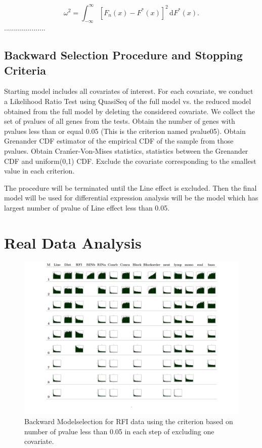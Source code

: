 \documentclass[11pt]{article}
\begin{document}
\[
\omega^2 = \int_{-\infty}^{\infty} [F_n(x)-F^*(x)]^2\,\mathrm{d}F^*(x) .
\]
.....................
\subsection{Backward Selection Procedure and Stopping Criteria}

Starting model includes all covariates of interest. For each covariate,
we conduct a Likelihood Ratio Test using QuasiSeq of the full model
vs. the reduced model obtained from the full model by deleting the
considered covariate. We collect the set of pvalues of all genes from
the tests.
Obtain the number of genes with pvalues less than or equal 0.05 (This is the criterion named pvalue05).
Obtain Grenander CDF estimator of the empirical CDF of the sample
from those pvalues.
Obtain Craḿer-Von-Mises statistics,
 statistics between the Grenander CDF and
uniform(0,1) CDF.
Exclude the covariate corresponding to the smallest value in each criterion.

The procedure will be terminated until the Line effect is excluded.  Then the final model will be used for differential expression analysis will be the model which has largest number of pvalue of Line effect less than 0.05.
\section{Real Data Analysis}
\begin{figure}[h!]
\centering
\includegraphics[scale = 0.23]{PlotG9P2PairedEndCBCpvalue05.pdf}
\caption{Backward Modelselection for RFI data using the criterion based on number of pvalue less than 0.05 in each step of excluding one covariate. }
\end{figure}
\end{document}
